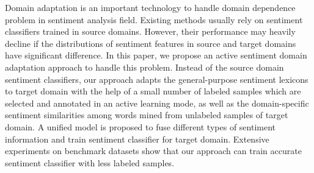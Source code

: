 Domain adaptation is an important technology to handle domain dependence problem in sentiment analysis field. Existing methods usually rely on sentiment classifiers trained in source domains. However, their performance may heavily decline if the distributions of sentiment features in source and target domains have significant difference. In this paper, we propose an active sentiment domain adaptation approach to handle this problem. Instead of the source domain sentiment classifiers, our approach adapts the general-purpose sentiment lexicons to target domain with the help of a small number of labeled samples which are selected and annotated in an active learning mode, as well as the domain-specific sentiment similarities among words mined from unlabeled samples of target domain. A unified model is proposed to fuse different types of sentiment information and train sentiment classifier for target domain. Extensive experiments on benchmark datasets show that our approach can train accurate sentiment classifier with less labeled samples.
